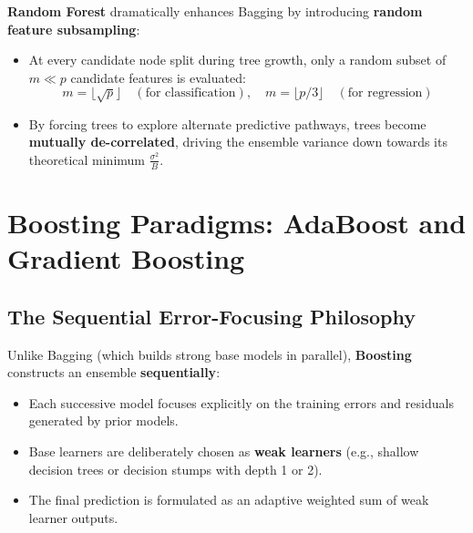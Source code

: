 \textbf{Random Forest} dramatically enhances Bagging by introducing \textbf{random feature subsampling}:
\begin{itemize}
    \item At every candidate node split during tree growth, only a random subset of $m \ll p$ candidate features is evaluated:
    \begin{equation}
        m = \lfloor \sqrt{p} \rfloor \quad (\text{for classification}), \quad m = \lfloor p / 3 \rfloor \quad (\text{for regression})
    \end{equation}
    \item By forcing trees to explore alternate predictive pathways, trees become \textbf{mutually de-correlated}, driving the ensemble variance down towards its theoretical minimum $\frac{\sigma^2}{B}$.
\end{itemize}

\section{Boosting Paradigms: AdaBoost and Gradient Boosting}

\subsection{The Sequential Error-Focusing Philosophy}
Unlike Bagging (which builds strong base models in parallel), \textbf{Boosting} constructs an ensemble \textbf{sequentially}:
\begin{itemize}
    \item Each successive model focuses explicitly on the training errors and residuals generated by prior models.
    \item Base learners are deliberately chosen as \textbf{weak learners} (e.g., shallow decision trees or decision stumps with depth 1 or 2).
    \item The final prediction is formulated as an adaptive weighted sum of weak learner outputs.
\end{itemize}

